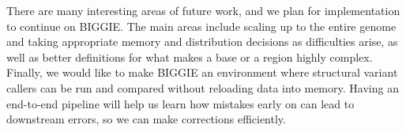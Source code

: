 \documentclass[10pt]{article}
\begin{document}
There are many interesting areas of future work, and we plan for implementation to continue on BIGGIE. The main areas include scaling up to the entire genome and taking appropriate memory and distribution decisions as difficulties arise, as well as better definitions for what makes a base or a region highly complex. Finally, we would like to make BIGGIE an environment where structural variant callers can be run and compared without reloading data into memory.  Having an end-to-end pipeline will help us learn how mistakes early on can lead to downstream errors, so we can make corrections efficiently. 

\onecolumn

\newpage
\end{document}
